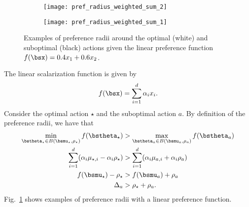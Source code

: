 \begin{figure}[t]
    \centering
    \begin{subfigure}[b]{0.35\textwidth}
        \texttt{[image: pref\_radius\_weighted\_sum\_2]}
    \end{subfigure}
    \qquad
    \begin{subfigure}[b]{0.35\textwidth}
        \texttt{[image: pref\_radius\_weighted\_sum\_1]}
    \end{subfigure}
    \caption{Examples of preference radii around the optimal (white) and suboptimal (black) actions given the linear preference function $f(\bsx) = 0.4 x_1 + 0.6 x_2$.}
\label{fig:pref_radius:example:weigthed_sum}
\end{figure}

\begin{example}[Linear]
\label{ex:linear}
    The linear scalarization function is given by
    \begin{align*}
        f(\bsx) = \sum_{i = 1}^d \alpha_i x_i.
    \end{align*}
    Consider the optimal action $\star$ and the suboptimal action $a$. By definition of the preference radii, we have that
    \begin{align*}
        \min_{\bstheta_\star \in B(\bsmu_\star, \rho_\star)} f(\bstheta_\star) & > \max_{\bstheta_a \in B(\bsmu_a, \rho_a)} f(\bstheta_a) \\
        \sum_{i = 1}^d (\alpha_i \mu_{\star, i} - \alpha_i \rho_\star) &> \sum_{i = 1}^d (\alpha_i \mu_{a, i} + \alpha_i \rho_a) \\
        f(\bsmu_\star) - \rho_\star & > f(\bsmu_a) + \rho_a \\
        \Delta_a & > \rho_\star + \rho_a.
    \end{align*}
    Fig.~\ref{fig:pref_radius:example:weigthed_sum} shows examples of preference radii with a linear preference function.
\end{example}

